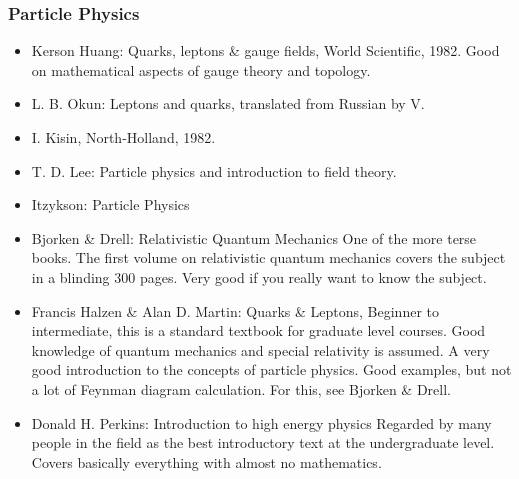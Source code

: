 \documentclass[10pt,a4paper]{book}
\theoremstyle{definition}
\begin{document}
\subsubsection{Particle Physics}

\begin{itemize}
\item 
Kerson Huang: Quarks, leptons \& gauge fields, World Scientific, 1982.
Good on mathematical aspects of gauge theory and topology.
\item L. B. Okun: Leptons and quarks, translated from Russian by V. \item I. Kisin, North-Holland, 1982.
\item T. D. Lee: Particle physics and introduction to field theory.
\item Itzykson: Particle Physics
\item Bjorken \& Drell: Relativistic Quantum Mechanics
One of the more terse books.  The first volume on relativistic quantum mechanics covers the subject in a blinding 300 pages.  Very good if you really want to know the subject.
\item Francis Halzen \& Alan D. Martin: Quarks \& Leptons,
Beginner to intermediate, this is a standard textbook for graduate level courses.  Good knowledge of quantum mechanics and special relativity is assumed.  A very good introduction to the concepts of particle physics.  Good examples, but not a lot of Feynman diagram calculation.  For this, see Bjorken \& Drell.

\item Donald H. Perkins: Introduction to high energy physics
Regarded by many people in the field as the best introductory text at the undergraduate level.  Covers basically everything with almost no mathematics.


\end{itemize}
\end{document}
